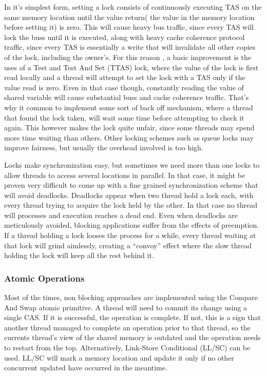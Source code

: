 In it's simplest form, setting a lock consists of  continuously executing TAS on the same memory location until the value return( the value in the memory location before setting it) is zero. This will cause heavy bus traffic, since every TAS will lock the buss until it is executed, along with heavy cache coherence protocol traffic, since every TAS is essentially a write that will invalidate all other copies of the lock, including the owner's. For this reason , a basic improvement is the uses of a Test and Test And Set (TTAS) lock, where the value of the lock is first read locally and a thread will attempt to set the lock with a TAS only if the value read is zero. Even in that case though, constantly reading the value of shared variable will cause substantial buss and cache coherence traffic. That's why it common to implement some sort of back off mechanism, where a thread that found the lock taken, will wait some time before attempting to check it again. This however makes the lock quite unfair, since some threads may spend more time waiting than others. Other locking schemes such as queue locks may improve fairness, but usually the overhead involved is too high.

Locks make synchronization easy, but sometimes we need more than one locks to allow threads to access several locations in parallel. In that case, it might be proven very difficult to come up with a fine grained synchronization scheme that will avoid deadlocks. Deadlocks appear when two thread hold a lock each, with every thread trying to acquire the lock held by the other. In that case no thread will processes and execution reaches a dead end. Even when deadlocks are meticulously avoided, blocking applications suffer from  the effects of preemption. If a thread holding a lock looses the process for a while, every thread waiting at that lock will grind aimlessly, creating a “convoy” effect where the slow thread holding the lock will keep all the rest behind it.

\subsubsection{Atomic Operations}

Most of the times, non blocking approaches are implemented using the Compare And Swap atomic primitive. A thread will need to commit its change using a single CAS. If it is successful, the operation is complete. If not, this is a sign that another thread managed to complete an operation prior to that thread, so the currents thread's view of the shared memory is outdated and the operation needs to restart from the top. Alternatively, Link-Store Conditional (LL/SC) can be used. LL/SC will mark a memory location and update it only if no other concurrent updated have occurred in the meantime.

